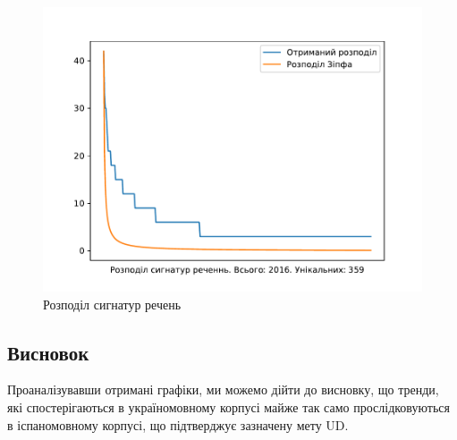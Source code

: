 \begin{multicols}{2}
\begin{figure}[H]
  \begin{center}
    \includegraphics[width=\linewidth]{article/images/chart_uk_sent_d_w_n.pdf}
  \end{center}
  \caption{Розподіл сигнатур речень}
  \label{img:es6}
\end{figure}
\end{multicols}

\subsection{Висновок}
Проаналізувавши отримані графіки, ми можемо дійти до висновку, що
тренди, які спостерігаються в україномовному корпусі майже так само
прослідковуються в іспаномовному корпусі, що підтверджує зазначену мету UD.